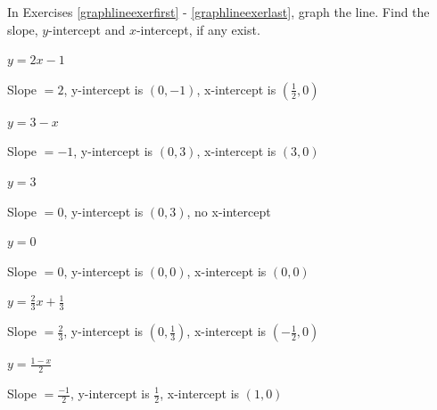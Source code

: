 \documentclass{ximera}
\begin{document}
\begin{question}
In Exercises \ref{graphlineexerfirst} - \ref{graphlineexerlast}, graph the line.  Find the slope, $y$-intercept and $x$-intercept, if any exist.

\begin{problem}\label{graphlineexerfirst}
$y = 2x - 1$ 

\begin{solution}

Slope $=2$, y-intercept is $(0,-1)$, x-intercept is $(\frac{1}{2},0)$
\end{solution}
\end{problem}

\begin{problem}
$y = 3 - x$

\begin{solution}

Slope $=-1$, y-intercept is $(0,3)$, x-intercept is $(3,0)$
\end{solution}
\end{problem}

\begin{problem}
$y = 3$

\begin{solution}

Slope $=0$, y-intercept is $(0,3)$, no x-intercept 
\end{solution}
\end{problem}

\begin{problem}
$y = 0$

\begin{solution}

Slope $=0$, y-intercept is $(0,0)$, x-intercept is $(0,0)$
\end{solution}
\end{problem}

\begin{problem}
$y = \frac{2}{3} x + \frac{1}{3}$

\begin{solution}

Slope $=\frac{2}{3}$, y-intercept is $(0,\frac{1}{3})$, x-intercept is $(-\frac{1}{2},0)$
\end{solution}
\end{problem}

\begin{problem}\label{graphlineexerlast}
$y = \frac{1-x}{2}$

\begin{solution}

Slope $=\frac{-1}{2}$, y-intercept is $\frac{1}{2}$, x-intercept is $(1,0)$
\end{solution}
\end{problem}
    
\end{question}
\end{document}
